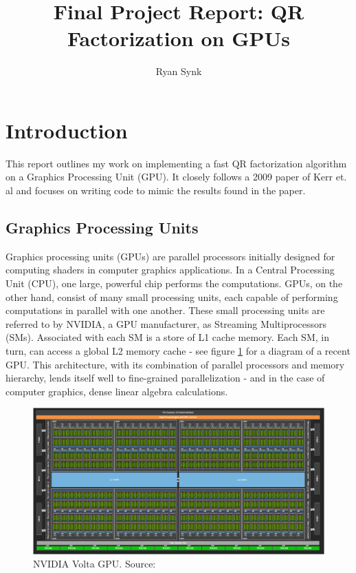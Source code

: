 \documentclass[12pt]{article}
\title{Final Project Report: QR Factorization on GPUs}
\author{Ryan Synk}
\begin{document}
\maketitle

\section*{Introduction}

This report outlines my work on implementing a fast QR factorization algorithm on a Graphics
Processing Unit (GPU). It closely follows a 2009 paper of Kerr et. al 
\cite{10.1145/1513895.1513904} and focuses on writing code to mimic the results found
in the paper.

\subsection*{Graphics Processing Units}

Graphics processing units (GPUs) are parallel processors initially designed for computing shaders
in computer graphics applications. In a Central Processing Unit (CPU), one large, powerful chip 
performs the computations. GPUs, on the other hand, consist of many small processing units, 
each capable of performing computations in parallel with one another. These small processing
units are referred to by NVIDIA, a GPU manufacturer, as Streaming Multiprocessors (SMs). 
Associated with each SM is a store of L1 cache memory. Each SM, in turn, can access a global 
L2 memory cache - see figure \ref{fig:gpudiagram} for a diagram of a recent GPU. This 
architecture, with its combination of parallel processors and memory hierarchy, lends 
itself well to fine-grained parallelization - and in the case of computer graphics, dense 
linear algebra calculations.

\begin{figure}[H]
    \includegraphics[scale=0.20]{gpu_diagram}
    \caption{NVIDIA Volta GPU. Source: \cite{volta_blogpost}}
    \label{fig:gpudiagram}
\end{figure}
\end{document}
